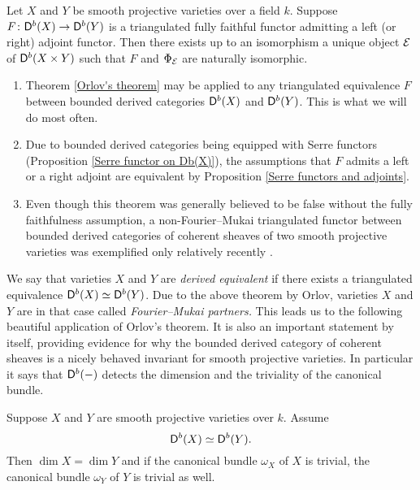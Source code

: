 \begin{theorem}
    \label{Orlov's theorem}
    \emph{\cite[Theorem 3.2.2]{Orlov2003}}
    Let $X$ and $Y$ be smooth projective varieties over a field $k$. Suppose $F \colon \mathsf{D}^b(X) \to \mathsf{D}^b(Y)$ is a triangulated fully faithful functor admitting a left (or right) adjoint functor. Then there exists up to an isomorphism a unique object $\mathcal E$ of $\mathsf{D}^b(X \times Y)$ such that $F$ and $\Phi_{\mathcal E}$ are naturally isomorphic.
\end{theorem}

\begin{remark}
    \begin{enumerate}[label = (\roman*)]
        \item Theorem \ref{Orlov's theorem} may be applied to any triangulated equivalence $F$ between bounded derived categories $\mathsf{D}^b(X)$ and $\mathsf{D}^b(Y)$. This is what we will do most often. 
        \item Due to bounded derived categories being equipped with Serre functors (Proposition \ref{Serre functor on Db(X)}), the assumptions that $F$ admits a left or a right adjoint are equivalent by Proposition \ref{Serre functors and adjoints}.
        \item{Even though this theorem was generally believed to be false without the fully faithfulness assumption, a non-Fourier--Mukai triangulated functor between bounded derived categories of coherent sheaves of two smooth projective varieties was exemplified only relatively recently \cite{RizzardoVanDenBerghNeeman2019}.}
    \end{enumerate}
\end{remark}

We say that varieties $X$ and $Y$ are \emph{derived equivalent} if there exists a triangulated equivalence $\mathsf{D}^b(X) \simeq \mathsf{D}^b(Y)$. Due to the above theorem by Orlov, varieties $X$ and $Y$ are in that case called \emph{Fourier--Mukai partners.}
This leads us to the following beautiful application of Orlov's theorem. It is also an important statement by itself, providing evidence for why the bounded derived category of coherent sheaves is a nicely behaved invariant for smooth projective varieties. In particular it says that $\mathsf{D}^b(-)$ detects the dimension and the triviality of the canonical bundle.  
\begin{theorem}
    \label{Db detects dimension and triviality of canonical bundle}
    \emph{\cite[Lemma 2.1]{bridgeland2001complex}}
    Suppose $X$ and $Y$ are smooth projective varieties over $k$. Assume
    \[
        \mathsf{D}^b(X) \simeq \mathsf{D}^b(Y).
    \]
    Then $\dim X = \dim Y$ and if the canonical bundle $\omega_X$ of $X$ is trivial, the canonical bundle $\omega_Y$ of $Y$ is trivial as well.
\end{theorem}

